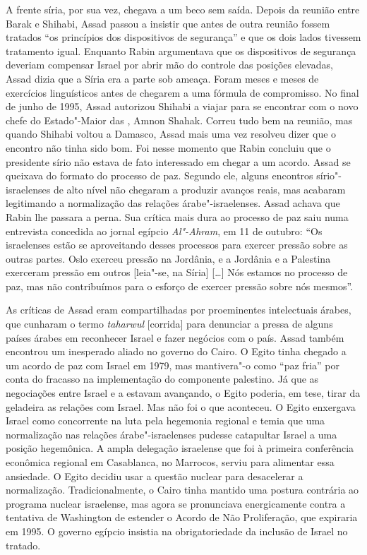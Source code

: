 A frente síria, por sua vez, chegava a um beco sem saída. Depois da
reunião entre Barak e Shihabi, Assad passou a insistir que antes de outra
reunião fossem tratados ``os princípios dos dispositivos de segurança''
e que os dois lados tivessem tratamento igual. Enquanto Rabin
argumentava que os dispositivos de segurança deveriam compensar Israel
por abrir mão do controle das posições elevadas, Assad dizia que a Síria
era a parte sob ameaça. Foram meses e meses de exercícios linguísticos
antes de chegarem a uma fórmula de compromisso. No final de junho de
1995, Assad autorizou Shihabi a viajar para se encontrar com o novo chefe
do Estado"-Maior das , Amnon Shahak. Correu tudo bem na reunião, mas
quando Shihabi voltou a Damasco, Assad mais uma vez resolveu dizer que o
encontro não tinha sido bom. Foi nesse momento que Rabin concluiu que o
presidente sírio não estava de fato interessado em chegar a um acordo.
Assad se queixava do formato do processo de paz. Segundo ele, alguns
encontros sírio"-israelenses de alto nível não chegaram a produzir
avanços reais, mas acabaram legitimando a normalização das relações
árabe"-israelenses. Assad achava que Rabin lhe passara a perna. Sua
crítica mais dura ao processo de paz saiu numa entrevista concedida ao
jornal egípcio \emph{Al"-Ahram}, em 11 de outubro: ``Os israelenses estão
se aproveitando desses processos para exercer pressão sobre as outras
partes. Oslo exerceu pressão na Jordânia, e a Jordânia e a Palestina
exerceram pressão em outros {[}leia"-se, na Síria{]} {[}\ldots{}{]} Nós estamos no
processo de paz, mas não contribuímos para o esforço de exercer pressão
sobre nós mesmos''.

As críticas de Assad eram compartilhadas por proeminentes intelectuais
árabes, que cunharam o termo \emph{taharwul} {[}corrida{]} para
denunciar a pressa de alguns países árabes em reconhecer Israel e fazer
negócios com o país. Assad também encontrou um inesperado aliado no
governo do Cairo. O Egito tinha chegado a um acordo de paz com Israel em
1979, mas mantivera"-o como ``paz fria'' por conta do fracasso na
implementação do componente palestino. Já que as negociações entre
Israel e a  estavam avançando, o Egito poderia, em tese, tirar da
geladeira as relações com Israel. Mas não foi o que aconteceu. O Egito
enxergava Israel como concorrente na luta pela hegemonia regional e
temia que uma normalização nas relações árabe"-israelenses pudesse
catapultar Israel a uma posição hegemônica. A ampla delegação israelense
que foi à primeira conferência econômica regional em Casablanca, no
Marrocos, serviu para alimentar essa ansiedade. O Egito decidiu usar a
questão nuclear para desacelerar a normalização. Tradicionalmente, o
Cairo tinha mantido uma postura contrária ao programa nuclear israelense, mas agora
se pronunciava energicamente contra a tentativa de Washington de
estender o Acordo de Não Proliferação, que expiraria em 1995. O governo
egípcio insistia na obrigatoriedade da inclusão de Israel no tratado.

